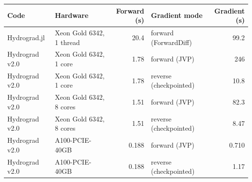 \begin{tabular}{llrlr}
\hline
Code & Hardware & Forward (s) & Gradient mode & Gradient (s) \\
\hline
Hydrograd.jl & Xeon Gold 6342, 1 thread & 20.4 & forward (ForwardDiff) & 99.2 \\
Hydrograd v2.0 & Xeon Gold 6342, 1 core & 1.78 & forward (JVP) & 246 \\
Hydrograd v2.0 & Xeon Gold 6342, 1 core & 1.78 & reverse (checkpointed) & 10.8 \\
Hydrograd v2.0 & Xeon Gold 6342, 8 cores & 1.51 & forward (JVP) & 82.3 \\
Hydrograd v2.0 & Xeon Gold 6342, 8 cores & 1.51 & reverse (checkpointed) & 8.47 \\
Hydrograd v2.0 & A100-PCIE-40GB & 0.188 & forward (JVP) & 0.710 \\
Hydrograd v2.0 & A100-PCIE-40GB & 0.188 & reverse (checkpointed) & 1.17 \\
\hline
\end{tabular}

